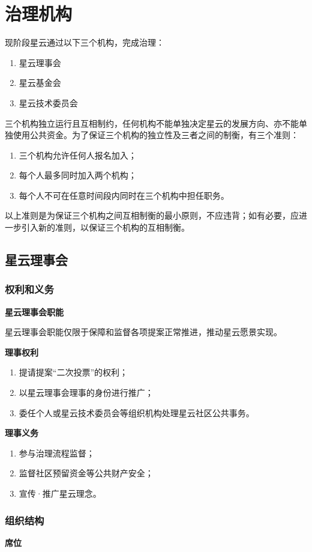 \section{治理机构}
现阶段星云通过以下三个机构，完成治理：
\begin{enumerate}
	\item 星云理事会
	\item 星云基金会
	\item 星云技术委员会
\end{enumerate}
三个机构独立运行且互相制约，任何机构不能单独决定星云的发展方向、亦不能单独使用公共资金。为了保证三个机构的独立性及三者之间的制衡，有三个准则：
\begin{enumerate}
	\item 三个机构允许任何人报名加入；
	\item 每个人最多同时加入两个机构；
	\item 每个人不可在任意时间段内同时在三个机构中担任职务。
\end{enumerate}
以上准则是为保证三个机构之间互相制衡的最小原则，不应违背；如有必要，应进一步引入新的准则，以保证三个机构的互相制衡。

\subsection{星云理事会}
\subsubsection{权利和义务}
\textbf{星云理事会职能}

星云理事会职能仅限于保障和监督各项提案正常推进，推动星云愿景实现。

\textbf{理事权利}
\begin{enumerate}
	\item 提请提案``二次投票''的权利；
	\item 以星云理事会理事的身份进行推广；
	\item 委任个人或星云技术委员会等组织机构处理星云社区公共事务。
\end{enumerate}
\textbf{理事义务}
\begin{enumerate}
	\item 参与治理流程监督；
	\item 监督社区预留资金等公共财产安全；
	\item 宣传·推广星云理念。
\end{enumerate}
\subsubsection{组织结构}
\textbf{席位}

